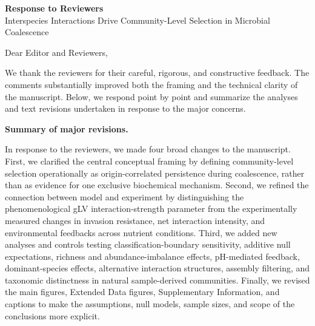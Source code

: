 \documentclass[11pt]{article}
\begin{document}
\begin{center}
{\Large \textbf{Response to Reviewers}}\\[0.5em]
{\large Interspecies Interactions Drive Community-Level Selection in Microbial Coalescence}
\end{center}

Dear Editor and Reviewers,

We thank the reviewers for their careful, rigorous, and constructive feedback. The comments substantially improved both the framing and the technical clarity of the manuscript. Below, we respond point by point and summarize the analyses and text revisions undertaken in response to the major concerns.

\textbf{Summary of major revisions.}

In response to the reviewers, we made four broad changes to the manuscript. First, we clarified the central conceptual framing by defining community-level selection operationally as origin-correlated persistence during coalescence, rather than as evidence for one exclusive biochemical mechanism. Second, we refined the connection between model and experiment by distinguishing the phenomenological gLV interaction-strength parameter from the experimentally measured changes in invasion resistance, net interaction intensity, and environmental feedbacks across nutrient conditions. Third, we added new analyses and controls testing classification-boundary sensitivity, additive null expectations, richness and abundance-imbalance effects, pH-mediated feedback, dominant-species effects, alternative interaction structures, assembly filtering, and taxonomic distinctness in natural sample-derived communities. Finally, we revised the main figures, Extended Data figures, Supplementary Information, and captions to make the assumptions, null models, sample sizes, and scope of the conclusions more explicit.


\clearpage

\clearpage

\end{document}
